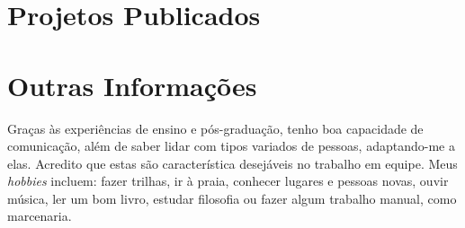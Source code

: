 \documentclass[letterpaper]{twentysecondcv} %
\begin{document}
\section{Projetos Publicados}
\vspace{-0.15cm}
\begin{twentyshort} %


	
	
	

\end{twentyshort}
\vspace{0.3cm}

\section{Outras Informações}
\vspace{-0.2cm}
\begin{adjustwidth}{0.5em}{0.0em}
	Graças às experiências de ensino e pós-graduação, tenho boa capacidade
	de comunicação, além de saber lidar com tipos variados de pessoas,
	adaptando-me a elas. Acredito que estas são característica desejáveis no
	trabalho em equipe. Meus \textit{hobbies} incluem: fazer trilhas, ir à
	praia, conhecer lugares e pessoas novas, ouvir música, ler um bom livro,
	estudar filosofia ou fazer algum trabalho manual, como marcenaria.
\end{adjustwidth}

\end{document}
